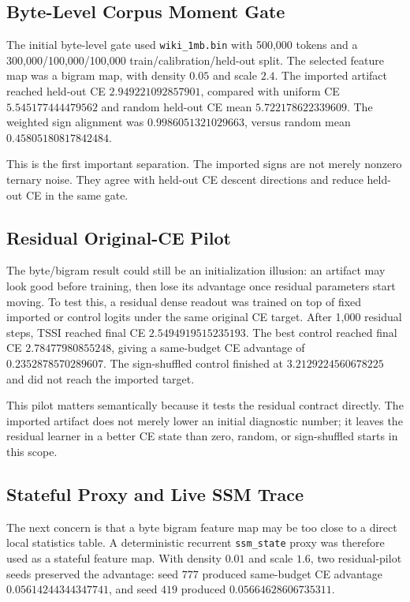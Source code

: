 \documentclass{article}
\begin{document}
\subsection{Byte-Level Corpus Moment Gate}

The initial byte-level gate used \texttt{wiki\_1mb.bin} with 500,000 tokens and
a 300,000/100,000/100,000 train/calibration/held-out split. The selected
feature map was a bigram map, with density $0.05$ and scale $2.4$. The imported
artifact reached held-out CE $2.949221092857901$, compared with uniform CE
$5.545177444479562$ and random held-out CE mean $5.722178622339609$. The
weighted sign alignment was $0.9986051321029663$, versus random mean
$0.45805180817842484$.

This is the first important separation. The imported signs are not merely
nonzero ternary noise. They agree with held-out CE descent directions and reduce
held-out CE in the same gate.

\subsection{Residual Original-CE Pilot}

The byte/bigram result could still be an initialization illusion: an artifact
may look good before training, then lose its advantage once residual parameters
start moving. To test this, a residual dense readout was trained on top of fixed
imported or control logits under the same original CE target. After 1,000
residual steps, TSSI reached final CE $2.5494919515235193$. The best control
reached final CE $2.78477980855248$, giving a same-budget CE advantage of
$0.2352878570289607$. The sign-shuffled control finished at
$3.2129224560678225$ and did not reach the imported target.

This pilot matters semantically because it tests the residual contract directly.
The imported artifact does not merely lower an initial diagnostic number; it
leaves the residual learner in a better CE state than zero, random, or
sign-shuffled starts in this scope.

\subsection{Stateful Proxy and Live SSM Trace}

The next concern is that a byte bigram feature map may be too close to a direct
local statistics table. A deterministic recurrent \texttt{ssm\_state} proxy was
therefore used as a stateful feature map. With density $0.01$ and scale $1.6$,
two residual-pilot seeds preserved the advantage: seed $777$ produced
same-budget CE advantage $0.05614244344347741$, and seed $419$ produced
$0.05664628606735311$.
\end{document}
